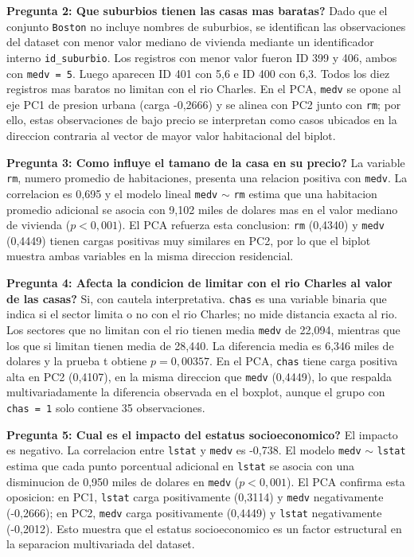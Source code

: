 \documentclass[10pt,a4paper]{article}
\begin{document}
\textbf{Pregunta 2: Que suburbios tienen las casas mas baratas?} Dado que el conjunto \texttt{Boston} no incluye nombres de suburbios, se identifican las observaciones del dataset con menor valor mediano de vivienda mediante un identificador interno \texttt{id\_suburbio}. Los registros con menor valor fueron ID 399 y 406, ambos con \texttt{medv = 5}. Luego aparecen ID 401 con 5,6 e ID 400 con 6,3. Todos los diez registros mas baratos no limitan con el rio Charles. En el PCA, \texttt{medv} se opone al eje PC1 de presion urbana (carga -0,2666) y se alinea con PC2 junto con \texttt{rm}; por ello, estas observaciones de bajo precio se interpretan como casos ubicados en la direccion contraria al vector de mayor valor habitacional del biplot.

\textbf{Pregunta 3: Como influye el tamano de la casa en su precio?} La variable \texttt{rm}, numero promedio de habitaciones, presenta una relacion positiva con \texttt{medv}. La correlacion es 0,695 y el modelo lineal \texttt{medv} $\sim$ \texttt{rm} estima que una habitacion promedio adicional se asocia con 9,102 miles de dolares mas en el valor mediano de vivienda ($p < 0,001$). El PCA refuerza esta conclusion: \texttt{rm} (0,4340) y \texttt{medv} (0,4449) tienen cargas positivas muy similares en PC2, por lo que el biplot muestra ambas variables en la misma direccion residencial.

\textbf{Pregunta 4: Afecta la condicion de limitar con el rio Charles al valor de las casas?} Si, con cautela interpretativa. \texttt{chas} es una variable binaria que indica si el sector limita o no con el rio Charles; no mide distancia exacta al rio. Los sectores que no limitan con el rio tienen media \texttt{medv} de 22,094, mientras que los que si limitan tienen media de 28,440. La diferencia media es 6,346 miles de dolares y la prueba t obtiene $p = 0,00357$. En el PCA, \texttt{chas} tiene carga positiva alta en PC2 (0,4107), en la misma direccion que \texttt{medv} (0,4449), lo que respalda multivariadamente la diferencia observada en el boxplot, aunque el grupo con \texttt{chas = 1} solo contiene 35 observaciones.

\textbf{Pregunta 5: Cual es el impacto del estatus socioeconomico?} El impacto es negativo. La correlacion entre \texttt{lstat} y \texttt{medv} es -0,738. El modelo \texttt{medv} $\sim$ \texttt{lstat} estima que cada punto porcentual adicional en \texttt{lstat} se asocia con una disminucion de 0,950 miles de dolares en \texttt{medv} ($p < 0,001$). El PCA confirma esta oposicion: en PC1, \texttt{lstat} carga positivamente (0,3114) y \texttt{medv} negativamente (-0,2666); en PC2, \texttt{medv} carga positivamente (0,4449) y \texttt{lstat} negativamente (-0,2012). Esto muestra que el estatus socioeconomico es un factor estructural en la separacion multivariada del dataset.
\end{document}
